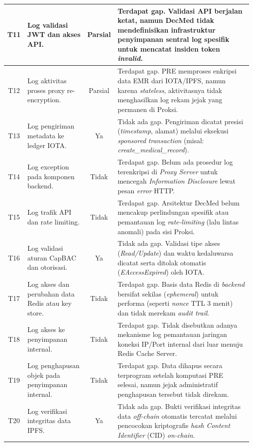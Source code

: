 \begin{xltabular}{\textwidth}{|c|>{\raggedright\arraybackslash}X|c|p{6cm}|}
    \hline
    T11 & Log validasi JWT dan akses API. & Parsial & Terdapat gap. Validasi API berjalan ketat, namun DecMed tidak mendefinisikan infrastruktur penyimpanan sentral log spesifik untuk mencatat insiden token \textit{invalid}. \\
    \hline
    T12 & Log aktivitas proses proxy re-encryption. & Parsial & Terdapat gap. PRE memproses enkripsi data EMR dari IOTA/IPFS, namun karena \textit{stateless}, aktivitasnya tidak menghasilkan log rekam jejak yang permanen di Proksi. \\
    \hline
    T13 & Log pengiriman metadata ke ledger IOTA. & Ya & Tidak ada gap. Pengiriman dicatat presisi (\textit{timestamp}, alamat) melalui eksekusi \textit{sponsored transaction} (misal: \textit{create\_medical\_record}). \\
    \hline
    T14 & Log exception pada komponen backend. & Tidak & Terdapat gap. Belum ada prosedur log terenkripsi di \textit{Proxy Server} untuk mencegah \textit{Information Disclosure} lewat pesan \textit{error} HTTP. \\
    \hline
    T15 & Log trafik API dan rate limiting. & Tidak & Terdapat gap. Arsitektur DecMed belum mencakup perlindungan spesifik atau pemantauan log \textit{rate-limiting} (lalu lintas anomali) pada sisi Proksi. \\
    \hline
    T16 & Log validasi aturan CapBAC dan otorisasi. & Ya & Tidak ada gap. Validasi tipe akses (\textit{Read/Update}) dan waktu kedaluwarsa dicatat serta ditolak otomatis (\textit{EAccessExpired}) oleh IOTA. \\
    \hline
    T17 & Log akses dan perubahan data Redis atau key store. & Tidak & Terdapat gap. Basis data Redis di \textit{backend} bersifat sekilas (\textit{ephemeral}) untuk performa (seperti \textit{nonce} TTL 3 menit) dan tidak merekam \textit{audit trail}. \\
    \hline
    T18 & Log akses ke penyimpanan internal. & Tidak & Terdapat gap. Tidak disebutkan adanya mekanisme log pemantauan jaringan koneksi IP/Port internal dari luar menuju Redis Cache Server. \\
    \hline
    T19 & Log penghapusan objek pada penyimpanan internal. & Tidak & Terdapat gap. Data dihapus secara terprogram setelah komputasi PRE selesai, namun jejak administratif penghapusan tersebut tidak direkam. \\
    \hline
    T20 & Log verifikasi integritas data IPFS. & Ya & Tidak ada gap. Bukti verifikasi integritas data \textit{off-chain} otomatis tercatat melalui pencocokan kriptografis \textit{hash Content Identifier} (CID) \textit{on-chain}. \\

\end{xltabular}
